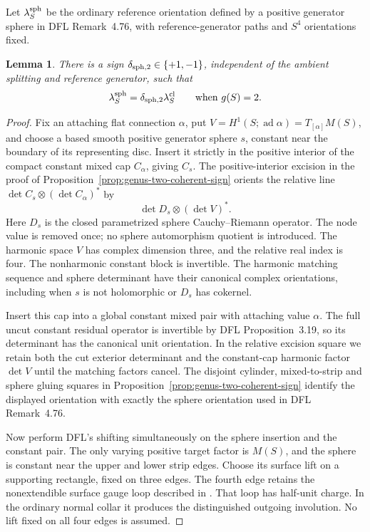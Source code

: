 \documentclass[11pt]{amsart}
\newtheorem{lemma}[theorem]{Lemma}
\theoremstyle{definition}
\theoremstyle{remark}
\theoremstyle{plain}
\begin{document}
Let $\lambda_S^{\rm sph}$ be the ordinary reference
orientation defined by a positive generator sphere in
DFL Remark~4.76, with reference-generator paths and
$S^4$ orientations fixed.

\begin{lemma}\label{lem:genus-two-reference-locality}
There is a sign $\delta_{{\rm sph},2}\in\{+1,-1\}$, independent
of the ambient splitting and reference generator, such that
\[
          \lambda_S^{\rm sph}=\delta_{{\rm sph},2}\lambda_S^{\rm cl}
                         \qquad\text{when }g(S)=2.
\]
\end{lemma}

\begin{proof}
Fix an attaching flat connection $\alpha$, put
$V=H^1(S;\operatorname{ad}\alpha)=T_{[\alpha]}M(S)$,
and choose a based smooth positive generator sphere $s$,
constant near the boundary of its representing disc.
Insert it strictly in the positive interior of the
compact constant mixed cap $C_\alpha$, giving $C_s$.
The positive-interior excision in the proof of
Proposition~\ref{prop:genus-two-coherent-sign}
orients the relative line
$\det C_s\otimes(\det C_\alpha)^*$ by
\[
                       \det D_s\otimes(\det V)^*.
\]
Here $D_s$ is the closed parametrized sphere
Cauchy--Riemann operator. The node value is removed
once; no sphere automorphism quotient is introduced.
The harmonic space $V$ has complex dimension three,
and the relative real index is four.
The nonharmonic constant block is invertible.
The harmonic matching sequence and sphere determinant
have their canonical complex orientations, including
when $s$ is not holomorphic or $D_s$ has cokernel.

Insert this cap into a global constant mixed pair
with attaching value $\alpha$. The full uncut constant
residual operator is invertible by DFL Proposition~3.19,
so its determinant has the canonical unit orientation.
In the relative excision square we retain both the cut
exterior determinant and the constant-cap harmonic
factor $\det V$ until the matching factors cancel.
The disjoint cylinder,
mixed-to-strip and sphere gluing squares in
Proposition~\ref{prop:genus-two-coherent-sign}
identify the displayed orientation with exactly
the sphere orientation used in DFL Remark~4.76.

Now perform DFL's shifting simultaneously on
the sphere insertion and the constant pair.
The only varying positive target factor is $M(S)$,
and the sphere is constant near the upper and
lower strip edges. Choose its surface lift
on a supporting rectangle, fixed on three edges.
The fourth edge retains the nonextendible
surface gauge loop described in
\cite[Section~2.2, p.~8]{DaeFukLip21a}.
That loop has half-unit charge. In the ordinary
normal collar it produces the distinguished
outgoing involution. No lift fixed on all
four edges is assumed.


\end{proof}
\end{document}
